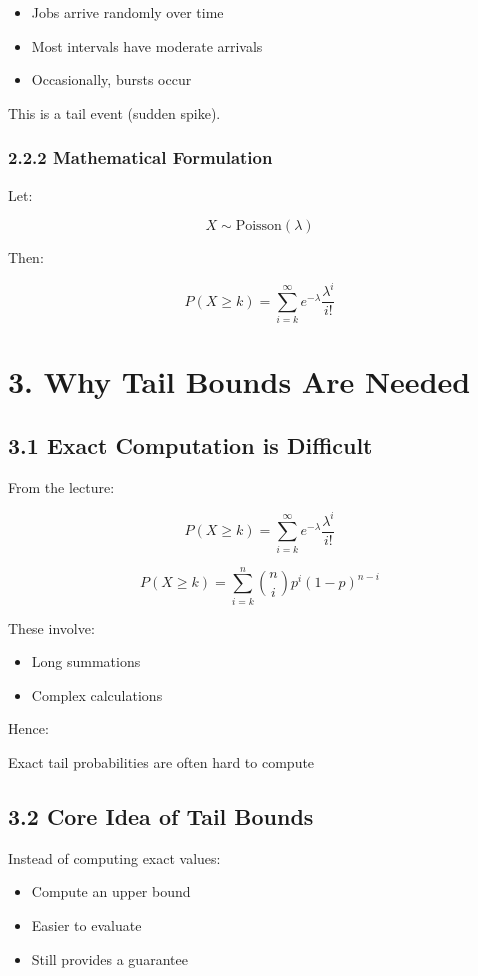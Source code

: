 \documentclass[12pt]{article}
\begin{document}
\begin{itemize}
\item Jobs arrive randomly over time
\item Most intervals have moderate arrivals
\item Occasionally, bursts occur
\end{itemize}

This is a tail event (sudden spike).

\subsubsection*{2.2.2 Mathematical Formulation}

Let:

\[
X \sim \text{Poisson}(\lambda)
\]

Then:

\[
P(X \geq k) = \sum_{i = k}^{\infty} e^{-\lambda} \frac{\lambda^i}{i!}
\]

\section*{3. Why Tail Bounds Are Needed}

\subsection*{3.1 Exact Computation is Difficult}

From the lecture:

\[
P(X \geq k) = \sum_{i = k}^{\infty} e^{-\lambda} \frac{\lambda^i}{i!}
\]

\[
P(X \geq k) = \sum_{i = k}^{n} \binom{n}{i} p^i (1 - p)^{n - i}
\]

These involve:

\begin{itemize}
\item Long summations
\item Complex calculations
\end{itemize}

Hence:

Exact tail probabilities are often hard to compute

\subsection*{3.2 Core Idea of Tail Bounds}

Instead of computing exact values:

\begin{itemize}
\item Compute an upper bound
\item Easier to evaluate
\item Still provides a guarantee
\end{itemize}
\end{document}
